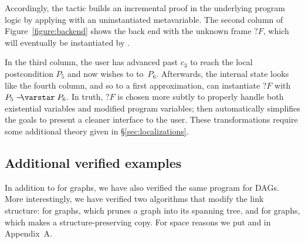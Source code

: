 Accordingly, the  tactic builds an incremental proof in the underlying program logic by applying  with an uninstantiated metavariable.
The second column of Figure~\ref{figure:backend} shows the back end with the unknown frame $?F$, which will eventually be instantiated by .

In the third column, the user has advanced past $c_3$ to reach the local postcondition $P_5$ and now wishes to  to~$P_6$.  Afterwards, the internal state looks like the fourth column, and so to a first approximation,  can instantiate $?F$ with $P_5 \wand P_6$.  In truth, $?F$ is chosen more subtly to properly handle both existential variables and modified program variables;  then automatically simplifies the goals to present a cleaner interface to the user.  These transformations require some additional theory given in \S\ref{sec:localizations}.

\subsection{Additional verified examples}
\label{sec:application}

In addition to  for graphs, we have also verified the same program for DAGs.
More interestingly, we have verified two algorithms that modify the link structure:
 for graphs, which prunes a graph into its spanning tree, and 
for graphs, which makes a structure-preserving copy.  For space reasons we put
 and  in Appendix~A\hide{\ref{apx:spanning}}.




